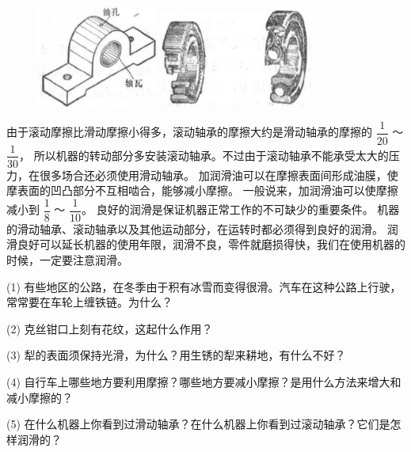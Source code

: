 \begin{figure}[htbp]
    \centering
    \begin{minipage}{4cm}
    \centering
    \includegraphics[width=4cm]{../pic/czwl1-ch3-14}
    \caption{}\label{fig:3-14}
    \end{minipage}
    \qquad \hspace{5em}
    \begin{minipage}{5cm}
    \centering
    \includegraphics[width=5cm]{../pic/czwl1-ch3-15}
    \caption{}\label{fig:3-15}
    \end{minipage}
\end{figure}

由于滚动摩擦比滑动摩擦小得多，滚动轴承的摩擦大约是滑动轴承的摩擦的 $\dfrac{1}{20}$ ～ $\dfrac{1}{30}$，
所以机器的转动部分多安装滚动轴承。不过由于滚动轴承不能承受太大的压力，在很多场合还必须使用滑动轴承。
加润滑油可以在摩擦表面间形成油膜，使摩表面的凹凸部分不互相啮合，能够减小摩擦。
一般说来，加润滑油可以使摩擦减小到 $\dfrac{1}{8}$ ～ $\dfrac{1}{10}$。
良好的润滑是保证机器正常工作的不可缺少的重要条件。
机器的滑动轴承、滚动轴承以及其他运动部分，在运转时都必须得到良好的润滑。
润滑良好可以延长机器的使用年限，润滑不良，零件就磨损得快，我们在使用机器的时候，一定要注意润滑。


\lianxi

(1) 有些地区的公路，在冬季由于积有冰雪而变得很滑。汽车在这种公路上行驶，常常要在车轮上缠铁链。为什么？

(2) 克丝钳口上刻有花纹，这起什么作用？

(3) 犁的表面须保持光滑，为什么？用生锈的犁来耕地，有什么不好？

(4) 自行车上哪些地方要利用摩擦？哪些地方要减小摩擦？是用什么方法来增大和减小摩擦的？

(5) 在什么机器上你看到过滑动轴承？在什么机器上你看到过滚动轴承？它们是怎样润滑的？

